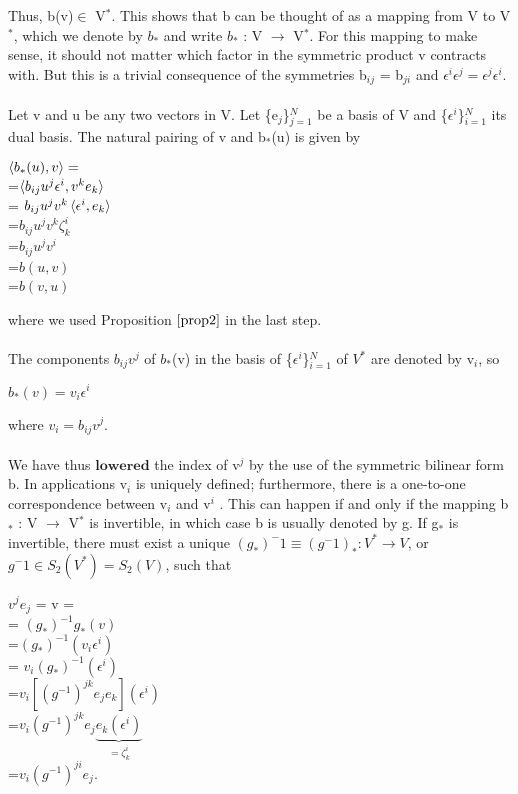 \documentclass[12pt,a4paper]{article}
\begin{document}
Thus, b(v)$\in$ V$^*$. This shows that b can be thought of as a mapping from
V to V$^*$, which we denote by $b_*$ and write $b_*$ : V $\to$ V$^*$. For this mapping
to make sense, it should not matter which factor in the symmetric product v
contracts with. But this is a trivial consequence of the symmetries b$_{ij}$ = b$_{ji}$
and $\epsilon^i \epsilon^j = \epsilon^j \epsilon^i.$\\
\\Let v and u be any two vectors in V. Let  \{e$_j$\}$^N_{j=1}$ be a basis of V and \{$\epsilon^i$\}$^N_{i=1}$ its dual basis. The natural pairing of v and b$_*$(u) is given by
\begin{center}
$\braket{b_*(u), v} = $\\
=$\braket{b_{ij} u^j \epsilon^i, v^k e_k} $\\
= $b_{ij}u^j v^k \braket{\epsilon^i, e_k}$\\
=$b_{ij}u^j v^k \zeta^i_k$\\
=$b_{ij}u^j v^i$\\
=$b(u,v)$\\
=$b(v,u)$

\end{center}
where we used Proposition $\ref{prop2}$ in the last step.\\
\\
The components $b_{ij}v^{j}$ of $b_*$(v) in the basis of \{$\epsilon^i$\}$^N_{i=1}$ of $V^*$ are denoted by v$_i$, so
\begin{center}
$b_*(v) = v_i \epsilon^i$
\end{center}
where $v_i = b_{ij} v^j$.\\
\\
We have thus $\textbf{lowered}$ the index of v$^j$ by the use of the symmetric bilinear
form b. In applications v$_i$ is uniquely defined; furthermore, there is a one-to-one correspondence between v$_i$ and v$^i$
. This can happen if and only if the
mapping b$_*$ : V $\to$ V$^*$ is invertible, in which case b is usually denoted by g.
If g$_*$ is invertible, there must exist a unique $(g_*)^-1 \equiv (g^-1)_* : V^* \to V$, or $g^-1 \in S_2(V^*)= S_2(V)$, such that
\begin{center}

$v^j e_j$ = v = \\
= $(g_*)^{-1} g_*(v)$\\
=$(g_*)^{-1} (v_i \epsilon^i)$\\
= $v_i (g_*)^{-1}(\epsilon^i)$\\
=$v_i [ (g^{-1})^{jk} e_j e_k ]( \epsilon^i) $\\
=$v_i (g^{-1}) ^ {jk} e_j \underbrace{e_k (\epsilon^i)}_{= \zeta^i_k}$\\
=$v_i (g^{-1})^{ji} e_j$.
\end{center}
\end{document}
